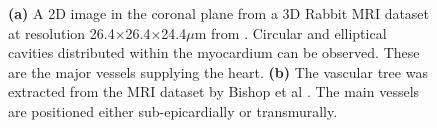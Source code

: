   \begin{figure}[htbp]
		\centering
		\qquad
    \caption{\textbf{(a)} A 2D image in the coronal plane from a 3D Rabbit MRI dataset at resolution 26.4×26.4×24.4$\mu$m from \cite{Burton2006}. Circular and elliptical cavities distributed within the myocardium can be observed.  These are the major vessels supplying the heart. \textbf{(b)} The vascular tree was extracted from the MRI dataset by Bishop et al \cite{Bishop2009}. The main vessels are positioned either sub-epicardially or transmurally.}
	  \label{fig:vessels}
	\end{figure}
  
